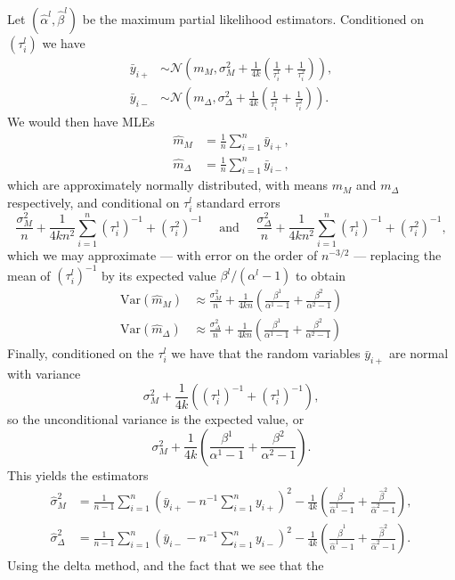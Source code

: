 \documentclass[
]{article}
\begin{document}
Let \((\hat\alpha^l,\hat\beta^l)\) be the maximum partial likelihood
estimators. Conditioned on \((\tau_i^l)\) we have \begin{align*}
  \bar{y}_{i+}&\sim \mathcal{N}\left(m_M, \sigma^2_M + \frac{1}{4k}\left( \frac{1}{\tau_i^1}+\frac{1}{\tau_i^2}\right)\right),\\
  \bar{y}_{i-}&\sim \mathcal{N}\left(m_\Delta,\sigma^2_\Delta + \frac{1}{4k}\left( \frac{1}{\tau_i^1}+\frac{1}{\tau_i^2}\right)\right).
\end{align*} We would then have MLEs \begin{align*}
  \hat{m}_M&= \frac{1}{n} \sum_{i=1}^n \bar{y}_{i+},\\
  \hat{m}_\Delta&= \frac{1}{n} \sum_{i=1}^n \bar{y}_{i-},
\end{align*} which are approximately normally distributed, with means
\(m_M\) and \(m_\Delta\) respectively, and conditional on \(\tau_i^l\)
standard errors \begin{equation}
  \frac{\sigma_M^2}{n}+\frac{1}{4kn^2} \sum_{i=1}^n (\tau_i^1)^{-1} + (\tau_i^2)^{-1} \quad \text{ and } \quad
  \frac{\sigma_\Delta^2}{n}+\frac{1}{4kn^2} \sum_{i=1}^n (\tau_i^1)^{-1} + (\tau_i^2)^{-1},
\end{equation} which we may approximate --- with error on the order of
\(n^{-3/2}\) --- replacing the mean of \((\tau_i^l)^{-1}\) by its
expected value \(\beta^l/(\alpha^l-1)\) to obtain \begin{align*}
  \mathrm{Var}(\hat{m}_M) &\approx \frac{\sigma_M^2}{n}+\frac{1}{4kn}\left( \frac{\beta^1}{\alpha^1-1}+ \frac{\beta^2}{\alpha^2-1}\right) \\
  \mathrm{Var}(\hat{m}_\Delta) &\approx \frac{\sigma_\Delta^2}{n}+\frac{1}{4kn}\left( \frac{\beta^1}{\alpha^1-1}+ \frac{\beta^2}{\alpha^2-1}\right) 
\end{align*} Finally, conditioned on the \(\tau_i^l\) we have that the
random variables \(\bar{y}_{i+}\) are normal with variance
\begin{equation}
  \sigma_M^2+\frac{1}{4k}\left((\tau_i^1)^{-1} + (\tau_i^1)^{-1} \right),
\end{equation} so the unconditional variance is the expected value, or
\begin{equation}
  \sigma_M^2+\frac{1}{4k}\left(\frac{\beta^1}{\alpha^1-1}+ \frac{\beta^2}{\alpha^2-1} \right).
\end{equation} This yields the estimators \begin{align*}
  \hat\sigma_M^2 &=\frac{1}{n-1}\sum_{i=1}^n\left(\bar{y}_{i+}-n^{-1}\sum_{i=1}^n y_{i+}\right)^2 - \frac{1}{4k}\left(\frac{\hat\beta^1}{\hat\alpha^1-1}+ \frac{\hat\beta^2}{\hat\alpha^2-1} \right),\\
  \hat\sigma_\Delta^2 &=\frac{1}{n-1}\sum_{i=1}^n\left(\bar{y}_{i-}-n^{-1}\sum_{i=1}^n y_{i-}\right)^2 - \frac{1}{4k}\left(\frac{\hat\beta^1}{\hat\alpha^1-1}+ \frac{\hat\beta^2}{\hat\alpha^2-1} \right).
\end{align*} Using the delta method, and the fact that we see that the
\end{document}

